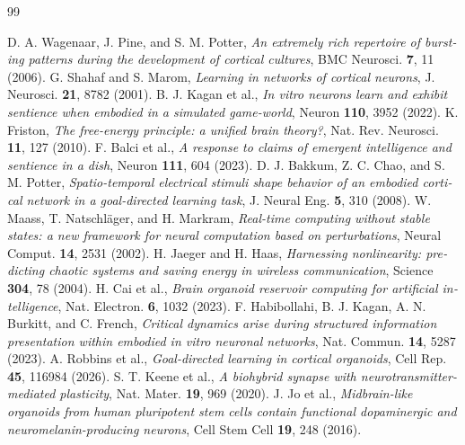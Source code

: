\begin{thebibliography}{99}
\begin{otherlanguage}{english}
 D. A. Wagenaar, J. Pine, and S. M. Potter, \emph{An extremely rich repertoire of bursting patterns during the development of cortical cultures}, BMC Neurosci. \textbf{7}, 11 (2006).
 G. Shahaf and S. Marom, \emph{Learning in networks of cortical neurons}, J. Neurosci. \textbf{21}, 8782 (2001).
 B. J. Kagan et al., \emph{In vitro neurons learn and exhibit sentience when embodied in a simulated game-world}, Neuron \textbf{110}, 3952 (2022).
 K. Friston, \emph{The free-energy principle: a unified brain theory?}, Nat. Rev. Neurosci. \textbf{11}, 127 (2010).
 F. Balci et al., \emph{A response to claims of emergent intelligence and sentience in a dish}, Neuron \textbf{111}, 604 (2023).
 D. J. Bakkum, Z. C. Chao, and S. M. Potter, \emph{Spatio-temporal electrical stimuli shape behavior of an embodied cortical network in a goal-directed learning task}, J. Neural Eng. \textbf{5}, 310 (2008).
 W. Maass, T. Natschl\"ager, and H. Markram, \emph{Real-time computing without stable states: a new framework for neural computation based on perturbations}, Neural Comput. \textbf{14}, 2531 (2002).
 H. Jaeger and H. Haas, \emph{Harnessing nonlinearity: predicting chaotic systems and saving energy in wireless communication}, Science \textbf{304}, 78 (2004).
 H. Cai et al., \emph{Brain organoid reservoir computing for artificial intelligence}, Nat. Electron. \textbf{6}, 1032 (2023).
 F. Habibollahi, B. J. Kagan, A. N. Burkitt, and C. French, \emph{Critical dynamics arise during structured information presentation within embodied in vitro neuronal networks}, Nat. Commun. \textbf{14}, 5287 (2023).
 A. Robbins et al., \emph{Goal-directed learning in cortical organoids}, Cell Rep. \textbf{45}, 116984 (2026).
 S. T. Keene et al., \emph{A biohybrid synapse with neurotransmitter-mediated plasticity}, Nat. Mater. \textbf{19}, 969 (2020).
 J. Jo et al., \emph{Midbrain-like organoids from human pluripotent stem cells contain functional dopaminergic and neuromelanin-producing neurons}, Cell Stem Cell \textbf{19}, 248 (2016).






















\end{otherlanguage}
\end{thebibliography}
